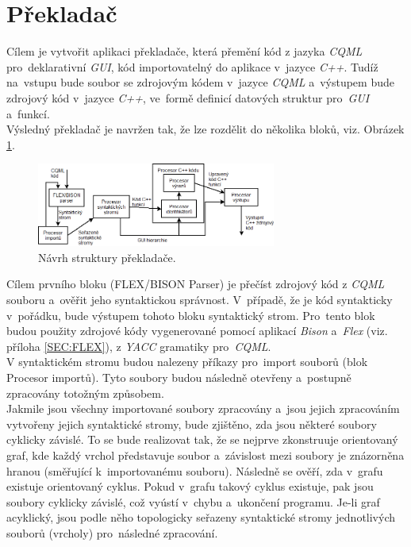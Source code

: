 \documentclass[11pt,twoside,a4paper]{book}
\begin{document}
\section{Překladač}
Cílem je vytvořit aplikaci překladače, která přemění kód z jazyka \textit{CQML} pro~deklarativní \textit{GUI}, kód importovatelný do aplikace v~jazyce \textit{C++}. Tudíž na~vstupu bude soubor se zdrojovým kódem v~jazyce \textit{CQML} a~výstupem bude zdrojový kód v~jazyce \textit{C++}, ve~formě definicí datových struktur pro~\textit{GUI} a~funkcí. \\
Výsledný překladač je navržen tak, že lze rozdělit do několika bloků, viz. Obrázek \ref{fig:fig1}.\\
\begin{figure}[!ht]
\begin{center}
  \includegraphics[width=0.7\textwidth]{parserdiag}
\caption{{\label{fig:fig1}}Návrh struktury překladače.}
\end{center}
\end{figure}
Cílem prvního bloku (FLEX/BISON Parser) je přečíst zdrojový kód z \textit{CQML} souboru a~ověřit jeho syntaktickou správnost. V~případě, že je kód syntakticky v~pořádku, bude výstupem tohoto bloku syntaktický strom. Pro~tento blok budou použity zdrojové kódy vygenerované pomocí aplikací \textit{Bison} a~\textit{Flex} (viz. příloha \ref{SEC:FLEX}), z \textit{YACC} gramatiky pro~\textit{CQML}.\\
V syntaktickém stromu budou nalezeny příkazy pro~import souborů (blok Procesor importů). Tyto soubory budou následně otevřeny a~postupně zpracovány totožným způsobem.\\
Jakmile jsou všechny importované soubory zpracovány a~jsou jejich zpracováním vytvořeny jejich syntaktické stromy, bude zjištěno, zda jsou některé soubory cyklicky závislé. To se bude realizovat tak, že se nejprve zkonstruuje orientovaný graf, kde každý vrchol představuje soubor a~závislost mezi soubory je znázorněna hranou (směřující k~importovanému souboru). Následně se ověří, zda v~grafu existuje orientovaný cyklus. Pokud v~grafu takový cyklus existuje, pak jsou soubory cyklicky závislé, což vyústí v~chybu a~ukončení programu. Je-li graf acyklický, jsou podle něho topologicky seřazeny syntaktické stromy jednotlivých souborů (vrcholy) pro~následné zpracování.\\ %
\end{document}
